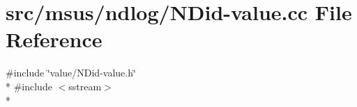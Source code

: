 \hypertarget{_n_did-value_8cc}{\section{src/msus/ndlog/\-N\-Did-\/value.cc File Reference}
\label{_n_did-value_8cc}
}
{\ttfamily \#include \char`\"{}value/\-N\-Did-\/value.\-h\char`\"{}}\\*
{\ttfamily \#include $<$sstream$>$}\\*
